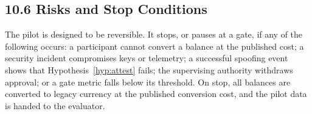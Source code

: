 \documentclass[11pt,a4paper]{article}
\theoremstyle{definition}
\theoremstyle{plain}
\theoremstyle{remark}
\begin{document}
\subsection*{10.6 Risks and Stop Conditions}
The pilot is designed to be reversible. It stops, or pauses at a gate, if any of the following occurs: a participant cannot convert a balance at the published cost; a security incident compromises keys or telemetry; a successful spoofing event shows that Hypothesis~\ref{hyp:attest} fails; the supervising authority withdraws approval; or a gate metric falls below its threshold. On stop, all balances are converted to legacy currency at the published conversion cost, and the pilot data is handed to the evaluator.


\appendix
\clearpage
\clearpage
\end{document}
